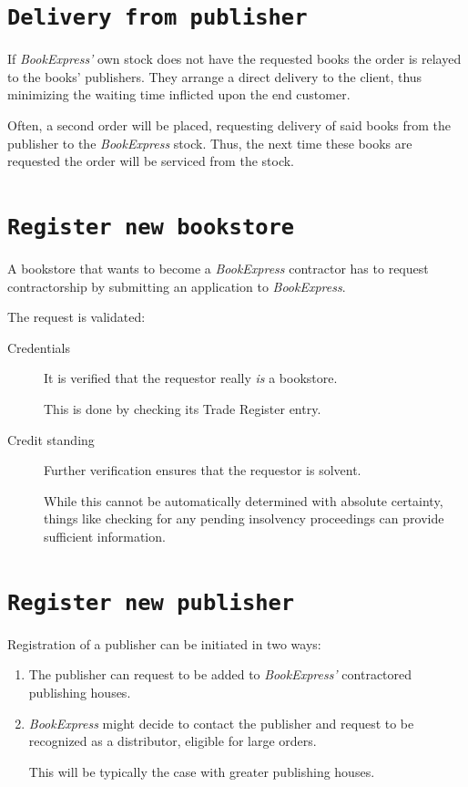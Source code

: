 \section{\texttt{Delivery from publisher}}
If \emph{BookExpress'} own stock does not have the requested books the order is relayed to the books' publishers. They arrange a direct delivery
to the client, thus minimizing the waiting time inflicted upon the end customer.

Often, a second order will be placed, requesting delivery of said books from the publisher to the \emph{BookExpress} stock. Thus, the next time these
books are requested the order will be serviced from the stock.


\section{\texttt{Register new bookstore}}
A bookstore that wants to become a \emph{BookExpress} contractor has to request contractorship by submitting an application to \emph{BookExpress}.

The request is validated:
\begin{description}
	\item[Credentials] It is verified that the requestor really \emph{is} a bookstore.

	                   This is done by checking its Trade Register entry.
	\item[Credit standing] Further verification ensures that the requestor is solvent.

	                       While this cannot be automatically determined with absolute certainty, things like checking for any pending
						   insolvency proceedings can provide sufficient information.
\end{description}


\section{\texttt{Register new publisher}}
Registration of a publisher can be initiated in two ways:
\begin{enumerate}
	\item The publisher can request to be added to \emph{BookExpress'} contractored publishing houses.
	\item \emph{BookExpress} might decide to contact the publisher and request to be recognized as a distributor, eligible for large orders.
	      
		  This will be typically the case with greater publishing houses.
\end{enumerate}


